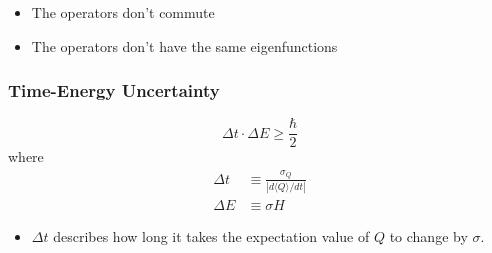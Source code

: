
\begin{itemize}
    \item The operators don't commute
    \item The operators don't have the same eigenfunctions
\end{itemize}



\subsubsection{Time-Energy Uncertainty}
\begin{equation*}
    \Delta t\cdot\Delta E\geqslant\frac\hbar2
\end{equation*}
where
\begin{align*}
    \Delta t & \equiv \frac{\sigma_Q}{|d\langle Q\rangle/dt|} \\
    \Delta E & \equiv \sigma H
\end{align*}

\begin{itemize}
    \item $\Delta t$ describes how long it takes the expectation value of $Q$ to change by $\sigma$.
\end{itemize}